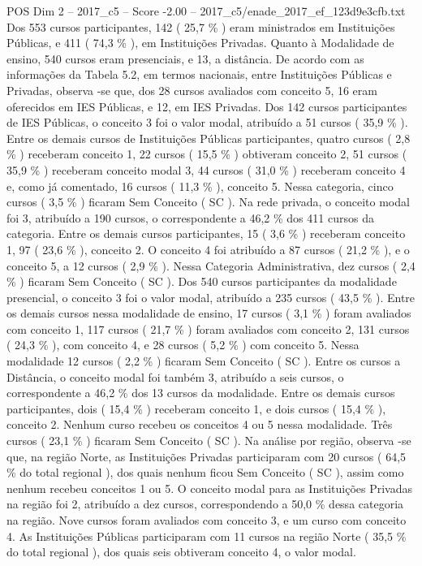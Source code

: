 \begin{textsample}{POS Dim 2 – 2017\_c5 – Score -2.00 – 2017\_c5/enade\_2017\_ef\_123d9e3cfb.txt}
Dos 553 cursos participantes, 142 ( 25,7 \% ) eram ministrados em Instituições Públicas, e 411 ( 74,3 \% ), em Instituições Privadas.
Quanto à Modalidade de ensino, 540 cursos eram presenciais, e 13, a distância.
De acordo com as informações da Tabela 5.2, em termos nacionais, entre Instituições Públicas e Privadas, observa -se que, dos 28 cursos avaliados com conceito 5, 16 eram oferecidos em IES Públicas, e 12, em IES Privadas.
Dos 142 cursos participantes de IES Públicas, o conceito 3 foi o valor modal, atribuído a 51 cursos ( 35,9 \% ).
Entre os demais cursos de Instituições Públicas participantes, quatro cursos ( 2,8 \% ) receberam conceito 1, 22 cursos ( 15,5 \% ) obtiveram conceito 2, 51 cursos ( 35,9 \% ) receberam conceito modal 3, 44 cursos ( 31,0 \% ) receberam conceito 4 e, como já comentado, 16 cursos ( 11,3 \% ), conceito 5.
Nessa categoria, cinco cursos ( 3,5 \% ) ficaram Sem Conceito ( SC ).
Na rede privada, o conceito modal foi 3, atribuído a 190 cursos, o correspondente a 46,2 \% dos 411 cursos da categoria.
Entre os demais cursos participantes, 15 ( 3,6 \% ) receberam conceito 1, 97 ( 23,6 \% ), conceito 2.
O conceito 4 foi atribuído a 87 cursos ( 21,2 \% ), e o conceito 5, a 12 cursos ( 2,9 \% ).
Nessa Categoria Administrativa, dez cursos ( 2,4 \% ) ficaram Sem Conceito ( SC ).
Dos 540 cursos participantes da modalidade presencial, o conceito 3 foi o valor modal, atribuído a 235 cursos ( 43,5 \% ).
Entre os demais cursos nessa modalidade de ensino, 17 cursos ( 3,1 \% ) foram avaliados com conceito 1, 117 cursos ( 21,7 \% ) foram avaliados com conceito 2, 131 cursos ( 24,3 \% ), com conceito 4, e 28 cursos ( 5,2 \% ) com conceito 5.
Nessa modalidade 12 cursos ( 2,2 \% ) ficaram Sem Conceito ( SC ).
Entre os cursos a Distância, o conceito modal foi também 3, atribuído a seis cursos, o correspondente a 46,2 \% dos 13 cursos da modalidade.
Entre os demais cursos participantes, dois ( 15,4 \% ) receberam conceito 1, e dois cursos ( 15,4 \% ), conceito 2.
Nenhum curso recebeu os conceitos 4 ou 5 nessa modalidade.
Três cursos ( 23,1 \% ) ficaram Sem Conceito ( SC ).
Na análise por região, observa -se que, na região Norte, as Instituições Privadas participaram com 20 cursos ( 64,5 \% do total regional ), dos quais nenhum ficou Sem Conceito ( SC ), assim como nenhum recebeu conceitos 1 ou 5.
O conceito modal para as Instituições Privadas na região foi 2, atribuído a dez cursos, correspondendo a 50,0 \% dessa categoria na região.
Nove cursos foram avaliados com conceito 3, e um curso com conceito 4.
As Instituições Públicas participaram com 11 cursos na região Norte ( 35,5 \% do total regional ), dos quais seis obtiveram conceito 4, o valor modal.

\end{textsample}

